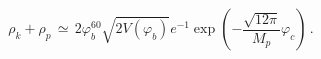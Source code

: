 \begin{equation} \label{rhok3}
\rho_k + \rho_p \, \simeq \, 2\varphi_{b}^{60}\sqrt{2V(\varphi_{b})}e^{-1}
\exp(-\frac{\sqrt{12 \pi}}{M_{p}}\varphi_{c}) \, .
\end{equation}


